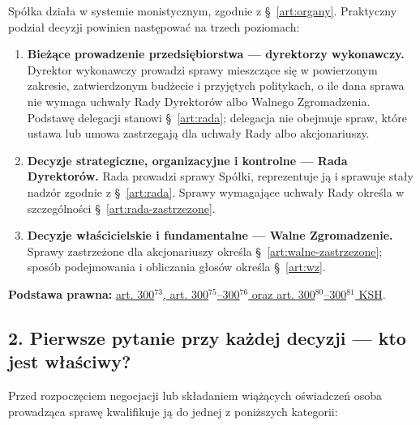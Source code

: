 \documentclass[12pt,a4paper]{report}
\begin{document}
Spółka działa w systemie monistycznym, zgodnie z §~\ref{art:organy}. Praktyczny podział decyzji powinien następować na trzech poziomach:
\begin{enumerate}
  \item \textbf{Bieżące prowadzenie przedsiębiorstwa — dyrektorzy wykonawczy.} Dyrektor wykonawczy prowadzi sprawy mieszczące się w powierzonym zakresie, zatwierdzonym budżecie i przyjętych politykach, o ile dana sprawa nie wymaga uchwały Rady Dyrektorów albo Walnego Zgromadzenia. Podstawę delegacji stanowi §~\ref{art:rada}; delegacja nie obejmuje spraw, które ustawa lub umowa zastrzegają dla uchwały Rady albo akcjonariuszy.
  \item \textbf{Decyzje strategiczne, organizacyjne i kontrolne — Rada Dyrektorów.} Rada prowadzi sprawy Spółki, reprezentuje ją i sprawuje stały nadzór zgodnie z §~\ref{art:rada}. Sprawy wymagające uchwały Rady określa w szczególności §~\ref{art:rada-zastrzezone}.
  \item \textbf{Decyzje właścicielskie i fundamentalne — Walne Zgromadzenie.} Sprawy zastrzeżone dla akcjonariuszy określa §~\ref{art:walne-zastrzezone}; sposób podejmowania i obliczania głosów określa §~\ref{art:wz}.
\end{enumerate}

\textbf{Podstawa prawna:} \href{https://eli.gov.pl/api/acts/DU/2024/18/text.html}{art. 300$^{73}$, art. 300$^{75}$--300$^{76}$ oraz art. 300$^{80}$--300$^{81}$ KSH}.

\subsection*{2. Pierwsze pytanie przy każdej decyzji — kto jest właściwy?}

Przed rozpoczęciem negocjacji lub składaniem wiążących oświadczeń osoba prowadząca sprawę kwalifikuje ją do jednej z poniższych kategorii:
\end{document}
